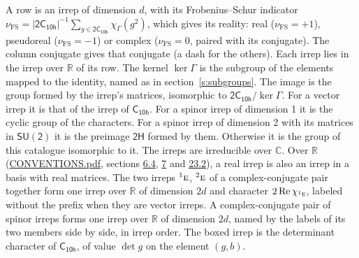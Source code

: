 \documentclass[10pt,a4paper]{article}
\numberwithin{equation}{section}
\newcommand{\grp}[1]{\mathsf{#1}}
\newcommand{\irr}[1]{\text{\normalfont\scshape #1}}
\newcommand{\conjpair}[1]{{}^{#1}}
\newcommand{\irchar}[1]{\chi_{#1}}
\newcommand{\fsind}{\nu_{\mathrm{FS}}}
\begin{document}
\leavevmode\label{n:index.frobenius}\label{n:head.irrep}\label{n:head.reality}A row is an irrep of dimension $d$, with its Frobenius--Schur indicator $\fsind = |\grp{2C_{10h}}|^{-1}\allowbreak\sum_{g\in\grp{2C_{10h}}}\irchar{\Gamma}(g^2)$, which gives its reality: real ($\fsind = +1$), pseudoreal ($\fsind = -1$) or complex ($\fsind = 0$, paired with its conjugate). \label{n:head.conjugate}The column conjugate gives that conjugate (a dash for the others). \label{n:head.over.real}Each irrep lies in the irrep over $\mathbb{R}$ of its row. \label{n:head.kernel}The kernel $\ker\Gamma$ is the subgroup of the elements mapped to the identity, named as in section~\ref{s:subgroups}. \label{n:head.image}The image is the group formed by the irrep's matrices, isomorphic to $\grp{2C_{10h}}/\ker\Gamma$. For a vector irrep it is that of the irrep of \href{../../../rotation/data/pdf/C10h.pdf}{$\grp{C_{10h}}$}. For a spinor irrep of dimension 1 it is the cyclic group of the characters. For a spinor irrep of dimension 2 with its matrices in $\grp{SU(2)}$ it is the preimage $\grp{2H}$ formed by them. Otherwise it is the group of this catalogue isomorphic to it. The irreps are irreducible over $\mathbb{C}$. Over $\mathbb{R}$ (\href{../../CONVENTIONS.pdf}{CONVENTIONS.pdf}, sections \href{../../../rotation/CONVENTIONS.pdf\#conv.6.4}{6.4}, \href{../../../rotation/CONVENTIONS.pdf\#conv.7}{7} and \href{../../CONVENTIONS.pdf\#conv.23.2}{23.2}), a real irrep is also an irrep in a basis with real matrices. The two irreps $\conjpair{1}\irr{e}$, $\conjpair{2}\irr{e}$ of a complex-conjugate pair together form one irrep over $\mathbb{R}$ of dimension $2d$ and character $2\operatorname{Re}\irchar{\conjpair{1}\irr{e}}$, labeled without the prefix when they are vector irreps. A complex-conjugate pair of spinor irreps forms one irrep over $\mathbb{R}$ of dimension $2d$, named by the labels of its two members side by side, in irrep order. \label{n:mark.determinant}The boxed irrep is the determinant character of \href{../../../rotation/data/pdf/C10h.pdf}{$\grp{C_{10h}}$}, of value $\det g$ on the element $(g, b)$.
\setlength{\emergencystretch}{2em}\par\setlength{\emergencystretch}{0pt}
\end{document}
